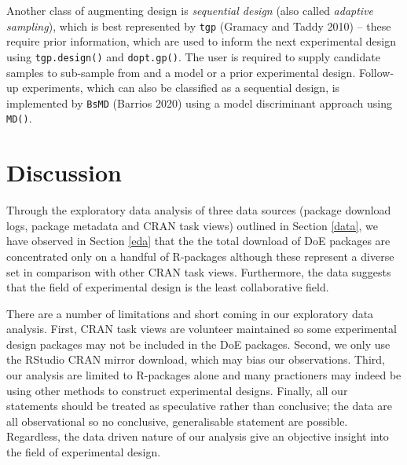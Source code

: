 \documentclass{article}
\begin{document}
Another class of augmenting design is \emph{sequential design} (also
called \emph{adaptive sampling}), which is best represented by
\texttt{tgp} (Gramacy and Taddy 2010) -- these require prior
information, which are used to inform the next experimental design using
\texttt{tgp.design()} and \texttt{dopt.gp()}. The user is required to
supply candidate samples to sub-sample from and a model or a prior
experimental design. Follow-up experiments, which can also be classified
as a sequential design, is implemented by \texttt{BsMD} (Barrios 2020)
using a model discriminant approach using \texttt{MD()}.

\hypertarget{discussion}{%
\section{Discussion}\label{discussion}}

Through the exploratory data analysis of three data sources (package
download logs, package metadata and CRAN task views) outlined in Section
\ref{data}, we have observed in Section \ref{eda} that the the total
download of DoE packages are concentrated only on a handful of
R-packages although these represent a diverse set in comparison with
other CRAN task views. Furthermore, the data suggests that the field of
experimental design is the least collaborative field.

There are a number of limitations and short coming in our exploratory
data analysis. First, CRAN task views are volunteer maintained so some
experimental design packages may not be included in the DoE packages.
Second, we only use the RStudio CRAN mirror download, which may bias our
observations. Third, our analysis are limited to R-packages alone and
many practioners may indeed be using other methods to construct
experimental designs. Finally, all our statements should be treated as
speculative rather than conclusive; the data are all observational so no
conclusive, generalisable statement are possible. Regardless, the data
driven nature of our analysis give an objective insight into the field
of experimental design.
\end{document}
